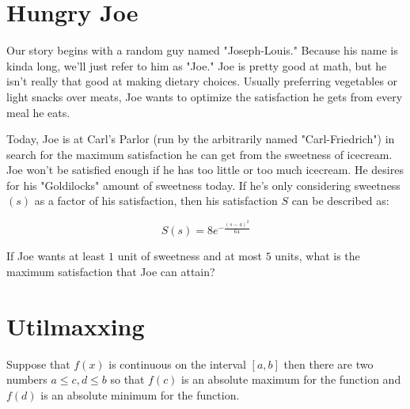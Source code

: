 
\setcounter{chapter}{0}
\chapter{Hungry Joe}
Our story begins with a random guy named "Joseph-Louis."
Because his name is kinda long, we'll just refer to him as "Joe."
Joe is pretty good at math, but he isn't really that good at making dietary choices.
Usually preferring vegetables or light snacks over meats, Joe wants to optimize the satisfaction he gets from every meal he eats.

Today, Joe is at Carl's Parlor (run by the arbitrarily named "Carl-Friedrich") in search for the maximum satisfaction he can get from the sweetness of icecream.
Joe won't be satisfied enough if he has too little or too much icecream.
He desires for his "Goldilocks" amount of sweetness today.
If he's only considering sweetness $(s)$ as a factor of his satisfaction, then his satisfaction $S$ can be described as:\par
\Large
\begin{equation}
	S(s) = 8e^{-\frac{(s-4)^2}{64}}
\end{equation}
\normalsize
\begin{eg}
	If Joe wants at least $1$ unit of sweetness and at most $5$ units, what is the maximum satisfaction that Joe can attain?
\end{eg}
\setcounter{chapter}{1}
\chapter{Utilmaxxing}

\begin{theorem}
	Suppose that \(f\left( x \right)\) is continuous on the interval \(\left[ {a,b} \right]\) then there are two numbers \(a \le c,d \le b\) so that \(f\left( c \right)\) is an absolute maximum for the function and \(f\left( d \right)\) is an absolute minimum for the function.
\end{theorem}